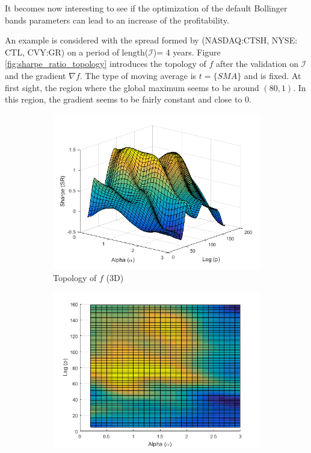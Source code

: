\documentclass[11pt,a4,twosided,singlespacing,titlepagenumber=on]{scrreprt}
\numberwithin{equation}{chapter} %
\theoremstyle{remark}
\begin{document}
It becomes now interesting to see if the optimization of the default Bollinger bands parameters can lead to an increase of the profitability. 

An example is considered with the spread formed by (NASDAQ:CTSH, NYSE: CTL, CVY:GR) on a period of length($\mathcal{I}$)= 4 years. Figure \ref{fig:sharpe_ratio_topology} introduces the topology of $f$ after the validation on $\mathcal{I}$ and the gradient $\nabla f$. The type of moving average is $t = \{ SMA \}$ and is fixed. At first sight, the region where the global maximum seems to be around $(80,1)$. In this region, the gradient seems to be fairly constant and close to 0.

\begin{figure}[H]
    \centering
    \begin{subfigure}[t]{0.32\textwidth}
        \centering
        \includegraphics[width=1\textwidth]{surf/1}
        \caption{Topology of $f$ (3D)}
        \label{}
    \end{subfigure}
    \begin{subfigure}[t]{0.32\textwidth}
        \centering
        \includegraphics[width=1\textwidth]{surf/2}

\end{subfigure}
\end{figure}
\end{document}
